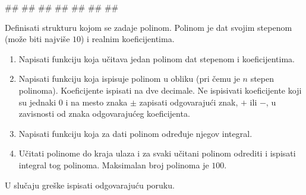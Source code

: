 \begin{Exercise}[difficulty=1, label=struc.8]
\begin{miditest}
\begin{upotreba}{3}
#\naslovInt#
##
##
##
##
##
##
\end{upotreba}
\end{miditest}

\end{Exercise}
\ifresenja
\begin{Answer}[ref=struc.8]
\end{Answer}
\fi


\begin{Exercise}[difficulty=1, label=struc.15] 
Definisati strukturu kojom se zadaje polinom. Polinom je dat svojim
stepenom (može biti najviše $10$) i realnim koeficijentima. 
\begin{enumerate}
\item Napisati funkciju koja učitava jedan polinom dat stepenom i
  koeficijentima.
\item Napisati funkciju koja ispisuje polinom u obliku  (pri čemu je $n$ stepen polinoma). Koeficijente
  ispisati na dve decimale. Ne ispisivati koeficijente koji su jednaki
  $0$ i na mesto znaka $\pm$ zapisati odgovarajući znak, $+$ ili $-$,
  u zavisnosti od znaka odgovarajućeg koeficijenta.
\item Napisati funkciju koja za dati polinom određuje njegov integral.
\item Učitati polinome do kraja ulaza i za svaki učitani polinom
  odrediti i ispisati integral tog polinoma. Maksimalan broj polinoma
  je $100$.
\end{enumerate}
U slučaju greške ispisati odgovarajuću poruku.


\end{Exercise}
